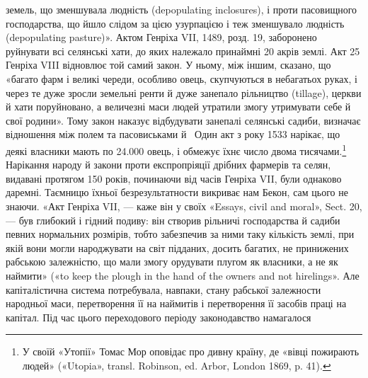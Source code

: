 \parcont{}  %
земель, що зменшувала людність (depopulating inclosures), і
проти пасовищного господарства, що йшло слідом за цією узурпацією
і теж зменшувало людність (depopulating pasture)».
Актом Генріха VII, 1489, розд. 19, заборонено руйнувати всі
селянські хати, до яких належало принаймні 20 акрів землі.
Акт 25 Генріха VIII відновлює той самий закон. У ньому, між
іншим, сказано, що «багато фарм і великі череди, особливо
овець, скупчуються в небагатьох руках, і через те дуже зросли
земельні ренти й дуже занепало рільництво (tillage), церкви й
хати поруйновано, а величезні маси людей утратили змогу утримувати
себе й свої родини». Тому закон наказує відбудувати
занепалі селянські садиби, визначає відношення між полем та
пасовиськами й~ Один акт з року 1533 нарікає, що деякі
власники мають по \num{24.000} овець, і обмежує їхнє число двома тисячами.\footnote{
У своїй «Утопії» Томас Мор оповідає про дивну країну, де
«вівці пожирають людей» («Utopia», transl. Robinson, ed. Arbor, London
1869, p. 41).
}
Нарікання народу й закони проти експропріяції дрібних
фармерів та селян, видавані протягом 150 років, починаючи від
часів Генріха VII, були однаково даремні. Таємницю їхньої
безрезультатности викриває нам Бекон, сам цього не знаючи.
«Акт Генріха VII, — каже він у своїх «Essays, civil and moral»,
Sect. 20, — був глибокий і гідний подиву: він створив рільничі
господарства й садиби певних нормальних розмірів, тобто забезпечив
за ними таку кількість землі, при якій вони могли народжувати
на світ підданих, досить багатих, не принижених рабською залежністю,
що мали змогу орудувати плугом як власники, а не
як наймити» («to keep the plough in the hand of the owners and
not hirelings». Але капіталістична система потребувала,
навпаки, стану рабської залежности народньої маси, перетворення
її на наймитів і перетворення її засобів праці на капітал.
Під час цього переходового періоду законодавство намагалося
\parbreak{}  %
